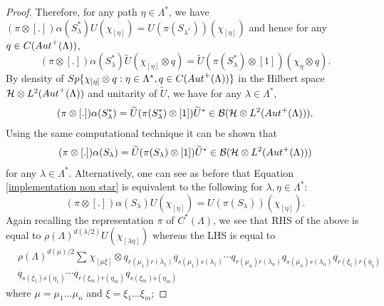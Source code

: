 \documentclass[10pt,a4paper]{amsart}
\newcommand{\cal}{\mathcal}
\newcommand{\clb}{{\cal B}}
\newcommand{\clh}{{\cal H}}
\begin{document}
\begin{proof}
Therefore, for any path $\eta\in\Lambda^{\ast}$, we have $(\pi\otimes[.])\alpha(S_{\lambda}^{\ast})U(\chi_{[\eta]})=U(\pi(S_{\lambda^{\ast}}))(\chi_{[\eta]})$ and hence for any $q\in C({\rm Aut}^{+}(\Lambda))$,
\begin{displaymath}
  (\pi\otimes[.])\alpha(S_{\lambda}^{\ast})\widetilde{U}(\chi_{[\eta]}\otimes q)=\widetilde{U}(\pi(S_{\lambda}^{\ast})\otimes [1])(\chi_{\eta}\otimes q). 
\end{displaymath} 
By density of ${\rm Sp}\{\chi_{[\eta]}\otimes q:\eta\in\Lambda^{\ast}, q\in C({\rm Aut}^{+}(\Lambda))\}$ in the Hilbert space $\clh\otimes L^{2}({\rm Aut}^{+}(\Lambda))$ and unitarity of $\widetilde{U}$, we have for any $\lambda\in\Lambda^{\ast}$,
\begin{eqnarray}
\label{implementation star}
    (\pi\otimes[.])\alpha(S_{\lambda}^{\ast})=\widetilde{U}(\pi(S_{\lambda}^{\ast})\otimes[1])\widetilde{U}^{\ast}\in \clb(\clh\otimes L^{2}({\rm Aut}^{+}(\Lambda))).
\end{eqnarray}
Using the same computational technique it can be shown that 
\begin{eqnarray}
\label{implementation non star}
    (\pi\otimes[.])\alpha(S_{\lambda})=\widetilde{U}(\pi(S_{\lambda})\otimes[1])\widetilde{U}^{\ast}\in \clb(\clh\otimes L^{2}({\rm Aut}^{+}(\Lambda)))
\end{eqnarray}
for any $\lambda\in\Lambda^{\ast}$. Alternatively, one can see as before that Equation \ref{implementation non star} is equivalent to the following for $\lambda,\eta\in\Lambda^{\ast}$:
\begin{equation}
\label{non star}
    (\pi\otimes[.])\alpha(S_{\lambda})U(\chi_{[\eta]})=U(\pi(S_{\lambda}))(\chi_{[\eta]}).
\end{equation}
Again recalling the representation $\pi$ of $C^{\ast}(\Lambda)$, we see that RHS of the above is equal to $\rho(\Lambda)^{d(\lambda/2)}U(\chi_{[\lambda\eta]})$ whereas the LHS is equal to 
\begin{equation}
\label{temp}    
\begin{aligned}
    &\rho(\Lambda)^{d(\mu)/2}\sum_{}\chi_{[\mu\xi]}\otimes q_{r(\mu_{1})r(\lambda_{1})}q_{s(\mu_{1})s(\lambda_{1})}\cdots q_{r(\mu_{n})r(\lambda_{n})}q_{s(\mu_{n})s(\lambda_{n})}q_{r(\xi_{1})r(\eta_{1})}\\
    &q_{s(\xi_{1})s(\eta_{1})}\cdots 
    q_{r(\xi_{m})r(\eta_{m})}q_{s(\xi_{m})s(\eta_{m})}
\end{aligned}
\end{equation} 
where $\mu=\mu_{1}\ldots\mu_{n}$ and $\xi=\xi_{1}\ldots\xi_{m}$;

\end{proof}
\end{document}
